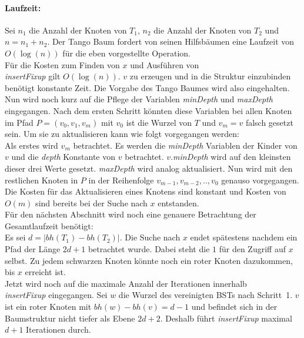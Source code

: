 \documentclass[a4paper,12pt]{article}
\begin{document}
\paragraph{Laufzeit:}
Sei $n_1$ die Anzahl der Knoten von $T_1$, $n_2$ die Anzahl der Knoten von $T_2$ und $n = n_1 + n_2$. Der Tango Baum fordert von seinen Hilfsbäumen eine Laufzeit von $O(\log \left(n\right))$ für die eben vorgestellte Operation.\\ Für die Kosten zum Finden von $x$ und Ausführen von \\ \textit{insertFixup}  gilt $O(\log (n))$. $v$ zu erzeugen und in die Struktur einzubinden benötigt konstante Zeit. 
Die Vorgabe des Tango Baumes wird also eingehalten.\\
Nun wird noch kurz auf die Pflege der Variablen  \textit{minDepth} und \textit{maxDepth} eingegangen. Nach dem ersten Schritt könnten diese Variablen bei allen Knoten im Pfad $P = \left(v_0, v_1, v_m\right)$ mit $v_0$ ist die Wurzel von $T$ und $v_m = v$ falsch gesetzt sein. Um sie zu aktualisieren kann wie folgt vorgegangen werden:\\
 Als erstes wird $v_m$ betrachtet. Es werden die \textit{minDepth} Variablen der Kinder von $v$ und die \textit{depth} Konstante von $v$ betrachtet. $v$.\textit{minDepth} wird auf den kleinsten dieser drei Werte gesetzt. \textit{maxDepth} wird analog aktualisiert. Nun wird mit den restlichen Knoten in $P$ in der Reihenfolge $v_{m-1}, v_{m-2},..,v_0$ genauso vorgegangen. Die Kosten für das Aktualisieren eines Knotens sind konstant und Kosten von $O\left(m\right)$ sind bereits bei der Suche nach $x$ entstanden. \\   
Für den nächsten Abschnitt wird noch eine genauere Betrachtung der Gesamtlaufzeit benötigt:\\ Es sei $d = \vert \mathit{bh}(T_1) - \mathit{bh}(T_2)  \vert $. Die Suche nach $x$ endet spätestens nachdem ein Pfad der Länge $2d + 1$ betrachtet wurde. Dabei steht die $1$ für den Zugriff auf $x$ selbst. Zu jedem schwarzen Knoten könnte noch ein roter Knoten dazukommen, bis $x$ erreicht ist.\\
 Jetzt wird noch auf die maximale Anzahl der Iterationen innerhalb \\ \textit{insertFixup} eingegangen.
 Sei $w$ die Wurzel des vereinigten BSTs nach \mbox{Schritt 1}. $v$ ist ein roter Knoten mit $\mathit{bh}(w) - \mathit{bh}(v) = d - 1$ und befindet sich in der Baumstruktur nicht tiefer als Ebene $2d + 2$. Deshalb führt \textit{insertFixup} maximal $d + 1$ Iterationen durch.  
\end{document}
